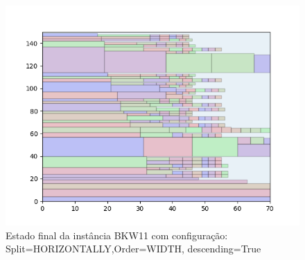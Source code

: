 \begin{figure}[H]
    \centering
    \caption[]{Estado final da instância BKW11 com configuração: Split=HORIZONTALLY,Order=WIDTH, descending=True}
    \label{fig:bkw11-horizontally-width-true}
    \includegraphics[scale=0.5]{output/figures/bkw/bkw11/horizontally/width/true/000}
\end{figure}